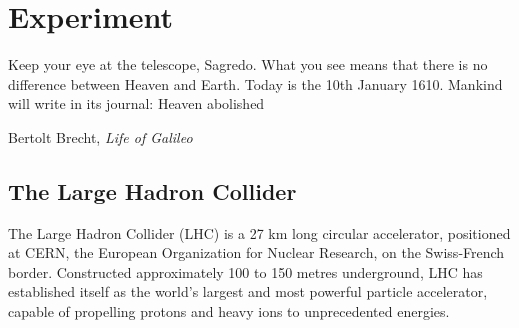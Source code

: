 
\chapter{Experiment}
\label{chp:experiment}

\epigraph{Keep your eye at the telescope, Sagredo. What you see means that there is no difference between Heaven
and Earth. Today is the 10th January 1610. Mankind will write in its journal: Heaven abolished}{Bertolt Brecht, \textit{Life of Galileo}}
\section{The Large Hadron Collider}
The Large Hadron Collider (LHC) is a 27 km long circular accelerator, positioned at CERN, the European Organization for Nuclear Research, on the Swiss-French border. Constructed approximately 100 to 150 metres underground, LHC has established itself as the world's largest and most powerful particle accelerator, capable of propelling protons and heavy ions to unprecedented energies.

